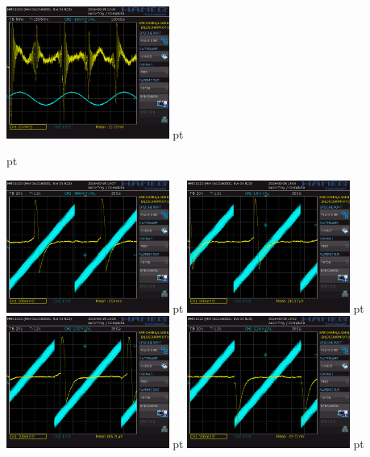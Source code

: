 \documentclass[12pt]{article}
\begin{document}
\begin{minipage}[h!]{\textwidth}
	\centering
	\includegraphics[width=0.4\textwidth]{data/HHH05.PNG} pt
\end{minipage}
 pt

\begin{minipage}[h!]{\textwidth}
	\centering
	\includegraphics[width=0.4\textwidth]{data/HHH06.PNG} pt
	\includegraphics[width=0.4\textwidth]{data/HHH07.PNG} pt
	\includegraphics[width=0.4\textwidth]{data/HHH08.PNG} pt
	\includegraphics[width=0.4\textwidth]{data/HHH09.PNG} pt

\end{minipage}
\end{document}

